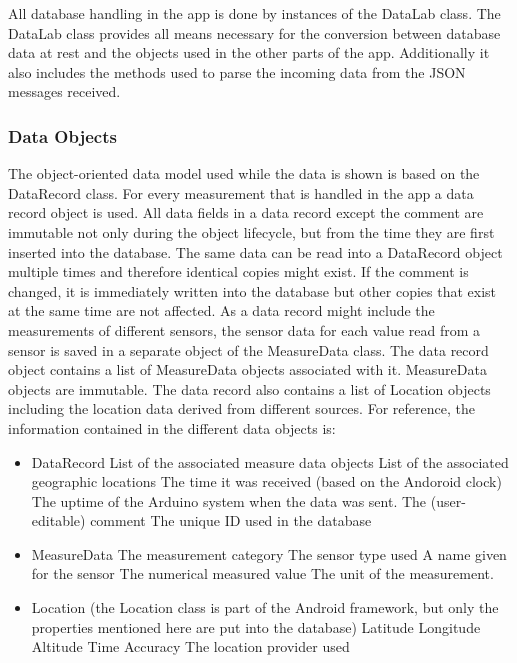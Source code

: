 All database handling in the app is done by instances of the DataLab class. The DataLab class provides all means necessary for the conversion between database data at rest and the objects used in the other parts of the app. Additionally it also includes the methods used to parse the incoming data from the JSON messages received.

\subsubsection{Data Objects}
The object-oriented data model used while the data is shown is based on the DataRecord class. For every measurement that is handled in the app a data record object is used. All data fields in a data record except the comment are immutable not only during the object lifecycle, but from the time they are first inserted into the database. The same data can be read into a DataRecord object multiple times and therefore identical copies might exist. If the comment is changed, it is immediately written into the database but other copies that exist at the same time are not affected. As a data record might include the measurements of different sensors, the sensor data for each value read from a sensor is saved in a separate object of the MeasureData class. The data record object contains a list of MeasureData objects associated with it. MeasureData objects are immutable. The data record also contains a list of Location objects including the location data derived from different sources. For reference, the information contained in the different data objects is:

\begin{itemize}
\item DataRecord
\subitem List of the associated measure data objects
\subitem List of the associated geographic locations
\subitem The time it was received (based on the Andoroid clock)
\subitem The uptime of the Arduino system when the data was sent.
\subitem The (user-editable) comment
\subitem The unique ID used in the database
\item MeasureData
\subitem The measurement category
\subitem The sensor type used
\subitem A name given for the sensor
\subitem The numerical measured value
\subitem The unit of the measurement. 
\item Location (the Location class is part of the Android framework, but only the properties mentioned here are put into the database)
\subitem Latitude
\subitem Longitude
\subitem Altitude
\subitem Time
\subitem Accuracy
\subitem The location provider used
\end{itemize}

